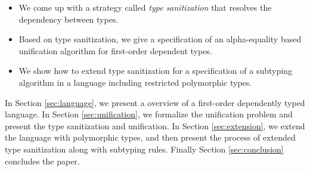 \begin{itemize}
  \item We come up with a strategy called \textit{type sanitization}
    that resolves the
    dependency between types.
  \item Based on type sanitization, we give a specification of an alpha-equality
    based unification algorithm
    for first-order dependent types.
  \item We show how to extend type sanitization for a specification of a
    subtyping algorithm
    in a language including restricted polymorphic types.
\end{itemize}

In Section \ref{sec:language}, we present a overview of a first-order dependently
typed language.
In Section \ref{sec:unification}, we formalize the unification
problem and present the type sanitization and unification. In
Section \ref{sec:extension}, we extend the language with
polymorphic types, and then present the process of extended type sanitization
along with subtyping rules. Finally Section \ref{sec:conclusion} concludes the
paper.